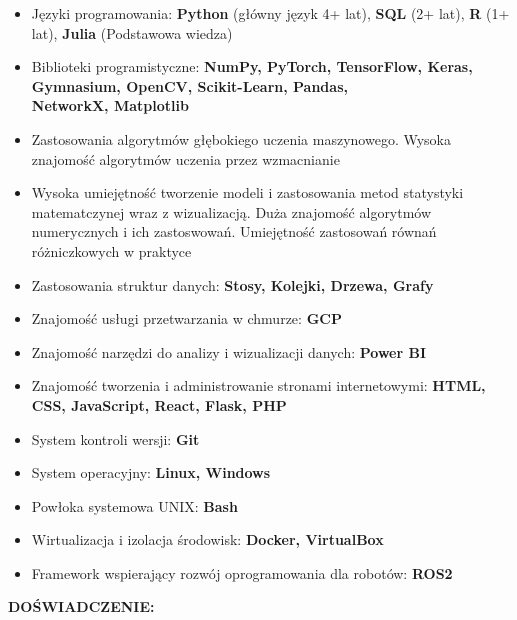 \documentclass[10pt]{article}
\begin{document}
\begin{itemize}[leftmargin=*, parsep=0.5pt]
    \item Języki programowania: \textbf{Python} (główny język 4+ lat), \textbf{SQL} (2+ lat), \textbf{R} (1+ lat), \textbf{Julia} (Podstawowa wiedza)
    \item Biblioteki programistyczne: \textbf{NumPy, PyTorch, TensorFlow, Keras, Gymnasium, OpenCV, Scikit-Learn, Pandas, \\ NetworkX, Matplotlib}
    \item Zastosowania algorytmów głębokiego uczenia maszynowego. Wysoka znajomość algorytmów uczenia przez wzmacnianie
    \item Wysoka umiejętność tworzenie modeli i zastosowania metod statystyki matematczynej wraz z wizualizacją. 
    Duża znajomość algorytmów numerycznych i ich zastoswowań. Umiejętność zastosowań równań różniczkowych w praktyce
    \item Zastosowania struktur danych: \textbf{Stosy, Kolejki, Drzewa, Grafy}
    \item Znajomość usługi przetwarzania w chmurze: \textbf{GCP}
    \item Znajomość narzędzi do analizy i wizualizacji danych: \textbf{Power BI}
    \item Znajomość tworzenia i administrowanie stronami internetowymi: \textbf{HTML, CSS, JavaScript, React, Flask, PHP}
    \item System kontroli wersji: \textbf{Git}
    \item System operacyjny: \textbf{Linux, Windows}
    \item Powłoka systemowa UNIX: \textbf{Bash} 
    \item Wirtualizacja i izolacja środowisk: \textbf{Docker, VirtualBox}
    \item Framework wspierający rozwój oprogramowania dla robotów: \textbf{ROS2}
\end{itemize}

\noindent \fontsize{14pt}{14pt}\selectfont \textbf{\color{Violet}DOŚWIADCZENIE:}
\fontsize{10pt}{10pt}\selectfont
\end{document}
